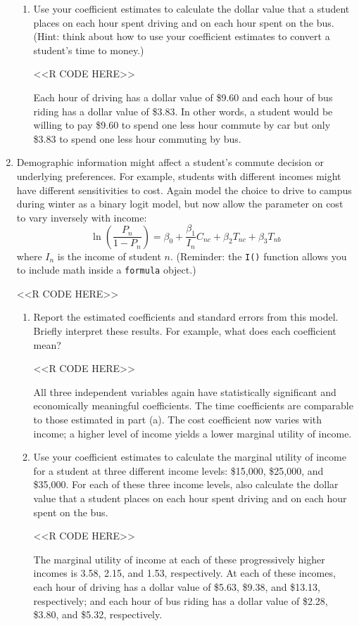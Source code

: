 \documentclass[11pt,letterpaper]{article}
\begin{document}
\begin{enumerate}[label=\alph*., leftmargin=*]
\begin{enumerate}[label=\roman*.]
		\item Use your coefficient estimates to calculate the dollar value that a student places on each hour spent driving and on each hour spent on the bus. (Hint: think about how to use your coefficient estimates to convert a student's time to money.)

		<<R CODE HERE>>

		Each hour of driving has a dollar value of \$9.60 and each hour of bus riding has a dollar value of \$3.83. In other words, a student would be willing to pay \$9.60 to spend one less hour commute by car but only \$3.83 to spend one less hour commuting by bus.
	\end{enumerate}

	\item Demographic information might affect a student's commute decision or underlying preferences. For example, students with different incomes might have different sensitivities to cost. Again model the choice to drive to campus during winter as a binary logit model, but now allow the parameter on cost to vary inversely with income:
	$$\ln \left( \frac{P_n}{1 - P_n} \right) = \beta_0 + \frac{\beta_1}{I_n} C_{nc} + \beta_2 T_{nc} + \beta_3 T_{nb}$$
	where $I_n$ is the income of student $n$. (Reminder: the \texttt{I()} function allows you to include math inside a \texttt{formula} object.)

	<<R CODE HERE>>

	\begin{enumerate}[label=\roman*.]
		\item Report the estimated coefficients and standard errors from this model. Briefly interpret these results. For example, what does each coefficient mean?

		<<R CODE HERE>>

		All three independent variables again have statistically significant and economically meaningful coefficients. The time coefficients are comparable to those estimated in part (a). The cost coefficient now varies with income; a higher level of income yields a lower marginal utility of income. 

		\item Use your coefficient estimates to calculate the marginal utility of income for a student at three different income levels: \$15,000, \$25,000, and \$35,000. For each of these three income levels, also calculate the dollar value that a student places on each hour spent driving and on each hour spent on the bus.

		<<R CODE HERE>>

		The marginal utility of income at each of these progressively higher incomes is 3.58, 2.15, and 1.53, respectively. At each of these incomes, each hour of driving has a dollar value of \$5.63, \$9.38, and \$13.13, respectively; and each hour of bus riding has a dollar value of \$2.28, \$3.80, and \$5.32, respectively.
	\end{enumerate}
\end{enumerate}
\end{document}
